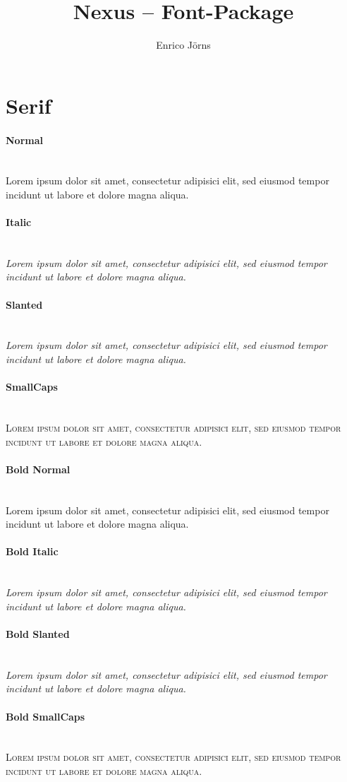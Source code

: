 \documentclass{scrartcl}
\title{Nexus -- Font-Package}
\author{Enrico Jörns}
\begin{document}
\maketitle

\section*{Serif}

\paragraph{Normal}\hfill\\
{
Lorem ipsum dolor sit amet, consectetur adipisici elit, sed eiusmod tempor
incidunt ut labore et dolore magna aliqua.}
\paragraph{Italic}\hfill\\
{\itshape
Lorem ipsum dolor sit amet, consectetur adipisici elit, sed eiusmod tempor
incidunt ut labore et dolore magna aliqua.}
\paragraph{Slanted}\hfill\\
{\slshape
Lorem ipsum dolor sit amet, consectetur adipisici elit, sed eiusmod tempor
incidunt ut labore et dolore magna aliqua.}
\paragraph{SmallCaps}\hfill\\
{\scshape
Lorem ipsum dolor sit amet, consectetur adipisici elit, sed eiusmod tempor
incidunt ut labore et dolore magna aliqua.}

{\bfseries
\paragraph{Bold Normal}\hfill\\
{
Lorem ipsum dolor sit amet, consectetur adipisici elit, sed eiusmod tempor
incidunt ut labore et dolore magna aliqua.}
\paragraph{Bold Italic}\hfill\\
{\itshape
Lorem ipsum dolor sit amet, consectetur adipisici elit, sed eiusmod tempor
incidunt ut labore et dolore magna aliqua.}
\paragraph{Bold Slanted}\hfill\\
{\slshape
Lorem ipsum dolor sit amet, consectetur adipisici elit, sed eiusmod tempor
incidunt ut labore et dolore magna aliqua.}
\paragraph{Bold SmallCaps}\hfill\\
{\scshape
Lorem ipsum dolor sit amet, consectetur adipisici elit, sed eiusmod tempor
incidunt ut labore et dolore magna aliqua.}
}
\end{document}
